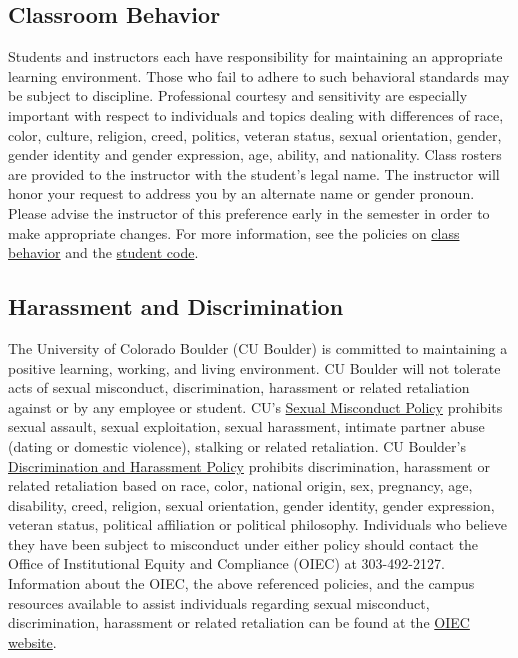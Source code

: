 \documentclass[10pt]{memoir}
\begin{document}
\subsection{Classroom Behavior}
Students and instructors each have responsibility for maintaining an appropriate learning environment. Those who fail to adhere to such behavioral standards may be subject to discipline. Professional courtesy and sensitivity are especially important with respect to individuals and topics dealing with differences of race, color, culture, religion, creed, politics, veteran status, sexual orientation, gender, gender identity and gender expression, age, ability, and nationality. Class rosters are provided to the instructor with the student's legal name. The instructor will honor your request to address you by an alternate name or gender pronoun. Please advise the instructor of this preference early in the semester in order to make appropriate changes. For more information, see the policies on \href{http://www.colorado.edu/policies/student-classroom-and-course-related-behavior}{class behavior} and the \href{http://www.colorado.edu/osc/#student_code}{student code}.

\subsection{Harassment and Discrimination}
The University of Colorado Boulder (CU Boulder) is committed to maintaining a positive learning, working, and living environment. CU Boulder will not tolerate acts of sexual misconduct, discrimination, harassment or related retaliation against or by any employee or student. CU's \href{http://www.colorado.edu/policies/discrimination-and-harassment-policy-and-procedures}{Sexual Misconduct Policy} prohibits sexual assault, sexual exploitation, sexual harassment, intimate partner abuse (dating or domestic violence), stalking or related retaliation. CU Boulder's \href{http://www.colorado.edu/policies/discrimination-and-harassment-policy-and-procedures}{Discrimination and Harassment Policy} prohibits discrimination, harassment or related retaliation based on race, color, national origin, sex, pregnancy, age, disability, creed, religion, sexual orientation, gender identity, gender expression, veteran status, political affiliation or political philosophy. Individuals who believe they have been subject to misconduct under either policy should contact the Office of Institutional Equity and Compliance (OIEC) at 303-492-2127. Information about the OIEC, the above referenced policies, and the campus resources available to assist individuals regarding sexual misconduct, discrimination, harassment or related retaliation can be found at the \href{http://www.colorado.edu/institutionalequity/}{OIEC website}.
\end{document}

